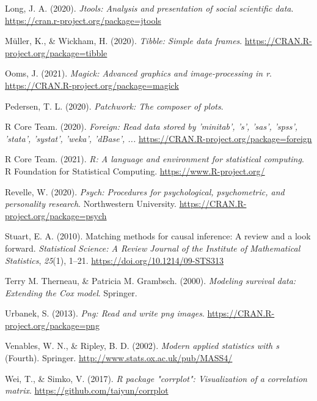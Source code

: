\documentclass[
  english,
  man, noextraspace]{apa7}
\begin{document}
\begin{appendix}
\leavevmode\hypertarget{ref-R-jtools}{}%
Long, J. A. (2020). \emph{Jtools: Analysis and presentation of social
scientific data}. \url{https://cran.r-project.org/package=jtools}

\leavevmode\hypertarget{ref-R-tibble}{}%
Müller, K., \& Wickham, H. (2020). \emph{Tibble: Simple data frames}.
\url{https://CRAN.R-project.org/package=tibble}

\leavevmode\hypertarget{ref-R-magick}{}%
Ooms, J. (2021). \emph{Magick: Advanced graphics and image-processing in
r}. \url{https://CRAN.R-project.org/package=magick}

\leavevmode\hypertarget{ref-R-patchwork}{}%
Pedersen, T. L. (2020). \emph{Patchwork: The composer of plots}.

\leavevmode\hypertarget{ref-R-foreign}{}%
R Core Team. (2020). \emph{Foreign: Read data stored by 'minitab', 's',
'sas', 'spss', 'stata', 'systat', 'weka', 'dBase', ...}
\url{https://CRAN.R-project.org/package=foreign}

\leavevmode\hypertarget{ref-R-base}{}%
R Core Team. (2021). \emph{R: A language and environment for statistical
computing}. R Foundation for Statistical Computing.
\url{https://www.R-project.org/}

\leavevmode\hypertarget{ref-R-psych}{}%
Revelle, W. (2020). \emph{Psych: Procedures for psychological,
psychometric, and personality research}. Northwestern University.
\url{https://CRAN.R-project.org/package=psych}

\leavevmode\hypertarget{ref-stuartMatchingMethodsCausal2010}{}%
Stuart, E. A. (2010). Matching methods for causal inference: A review
and a look forward. \emph{Statistical Science: A Review Journal of the
Institute of Mathematical Statistics}, \emph{25}(1), 1--21.
\url{https://doi.org/10.1214/09-STS313}

\leavevmode\hypertarget{ref-R-survival-book}{}%
Terry M. Therneau, \& Patricia M. Grambsch. (2000). \emph{Modeling
survival data: Extending the Cox model}. Springer.

\leavevmode\hypertarget{ref-R-png}{}%
Urbanek, S. (2013). \emph{Png: Read and write png images}.
\url{https://CRAN.R-project.org/package=png}

\leavevmode\hypertarget{ref-R-MASS}{}%
Venables, W. N., \& Ripley, B. D. (2002). \emph{Modern applied
statistics with s} (Fourth). Springer.
\url{http://www.stats.ox.ac.uk/pub/MASS4/}

\leavevmode\hypertarget{ref-R-corrplot2017}{}%
Wei, T., \& Simko, V. (2017). \emph{R package "corrplot": Visualization
of a correlation matrix}. \url{https://github.com/taiyun/corrplot}


\end{appendix}
\end{document}
